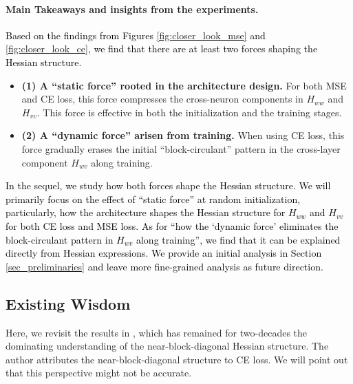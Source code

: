 \documentclass{article}
\newcommand{\1}{^{(1)}}
\newcommand{\2}{^{(2)}}
\newcommand{\yushunrevise}[1]{\textcolor{black}{ #1}}
\begin{document}
\begin{snugshade}
\paragraph{Main Takeaways and insights from the experiments.} \yushunrevise{Based on the findings from Figures  \ref{fig:closer_look_mse} and \ref{fig:closer_look_ce}, we find that there are at least two forces shaping the Hessian structure. }

\begin{itemize}[topsep=1pt,parsep=1pt,partopsep=1pt, leftmargin=*]
      \item {\bf (1)  A ``static force'' rooted in the architecture design.}  For both MSE and CE loss, this force compresses the cross-neuron components in $H_{ww}$ and $H_{vv}$. This force is effective in both the initialization and the training stages. 
    \item {\bf (2)  A ``dynamic force'' arisen from training.} When using CE loss, this force gradually erases the initial ``block-circulant'' pattern in the cross-layer component $H_{wv}$ along training.
\end{itemize}
 \end{snugshade}

\yushunrevise{In the sequel, we study how both forces shape the Hessian structure. We will primarily focus on the effect of ``static force'' at random initialization, particularly, how the architecture shapes the Hessian structure for $H_{ww}$ and $H_{vv}$ for both CE loss and MSE loss. As for ``how the `dynamic force' eliminates the block-circulant pattern in $H_{wv}$ along training'', we find that it can be explained directly from Hessian expressions. We provide an initial analysis in Section \ref{sec_preliminaries} and leave more fine-grained analysis as future direction.}










\vspace{-0.2cm}
\subsection{Existing Wisdom} 
\label{sec_collobert}

Here, we revisit the results in \citep{collobert2004large}, which has remained for two-decades the dominating
understanding of the near-block-diagonal Hessian structure. 
The author attributes the near-block-diagonal structure to CE loss.  We 
will point out that this perspective might not be accurate.
\end{document}
